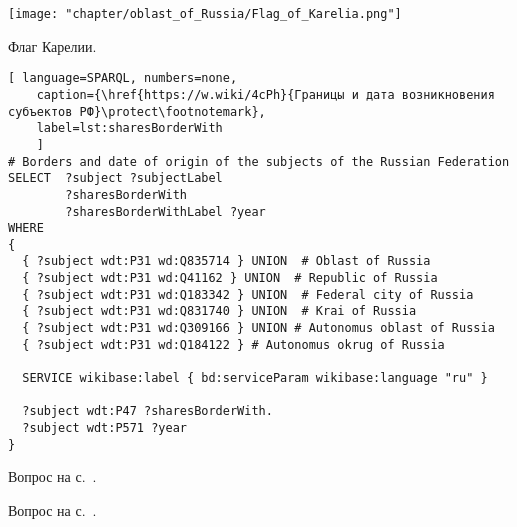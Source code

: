 \begin{task}
	\label{answer:subjects_of_Russia_1}
	
	\begin{marginfigure}[0.0cm]
{
	\setlength{\fboxsep}{0pt}%
	\setlength{\fboxrule}{1pt}%
	\texttt{[image: "chapter/oblast\_of\_Russia/Flag\_of\_Karelia.png"]}
}
\caption [Флаг Карелии, Россия.]{Флаг Карелии.}%
\label{fig:Flag_of_Karelia}%
\end{marginfigure}
	
	\begin{lstlisting}[ language=SPARQL, numbers=none,
	caption={\href{https://w.wiki/4cPh}{Границы и дата возникновения субъектов РФ}\protect\footnotemark},
	label=lst:sharesBorderWith
	]
# Borders and date of origin of the subjects of the Russian Federation
SELECT  ?subject ?subjectLabel 
        ?sharesBorderWith 
        ?sharesBorderWithLabel ?year
WHERE
{
  { ?subject wdt:P31 wd:Q835714 } UNION  # Oblast of Russia
  { ?subject wdt:P31 wd:Q41162 } UNION  # Republic of Russia
  { ?subject wdt:P31 wd:Q183342 } UNION  # Federal city of Russia
  { ?subject wdt:P31 wd:Q831740 } UNION  # Krai of Russia
  { ?subject wdt:P31 wd:Q309166 } UNION # Autonomus oblast of Russia
  { ?subject wdt:P31 wd:Q184122 } # Autonomus okrug of Russia
  
  SERVICE wikibase:label { bd:serviceParam wikibase:language "ru" }
  
  ?subject wdt:P47 ?sharesBorderWith. 
  ?subject wdt:P571 ?year
}
\end{lstlisting}
	
\small{Вопрос на с.~\pageref{lst:sharesBorderWith-oblast-of-Russia}.}
\end{task}

\begin{task}
	\label{answer:subjects_of_Russia_2}
\small{Вопрос на с.~\pageref{lst:sharesBorderWith-empty-oblast-of-Russia}.}
\end{task}

